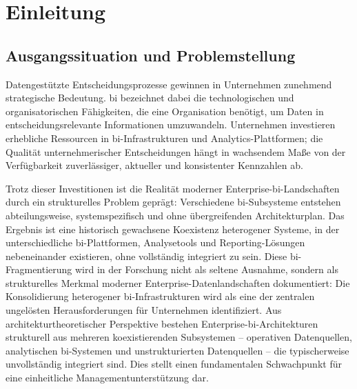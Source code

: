 \section{Einleitung}

\subsection{Ausgangssituation und Problemstellung}
\label{sec:einleitung-ausgangssituation}

Datengestützte Entscheidungsprozesse gewinnen in Unternehmen zunehmend strategische Bedeutung.
\gls{bi} bezeichnet dabei die technologischen und organisatorischen Fähigkeiten, die eine Organisation benötigt, um Daten in entscheidungsrelevante Informationen umzuwandeln.
Unternehmen investieren erhebliche Ressourcen in \gls{bi}-Infrastrukturen und Analytics-Plattformen; die Qualität unternehmerischer Entscheidungen hängt in wachsendem Maße von der Verfügbarkeit zuverlässiger, aktueller und konsistenter Kennzahlen ab.

Trotz dieser Investitionen ist die Realität moderner Enterprise-\gls{bi}-Landschaften durch ein strukturelles Problem geprägt: Verschiedene \gls{bi}-Subsysteme entstehen abteilungsweise, systemspezifisch und ohne übergreifenden Architekturplan.
Das Ergebnis ist eine historisch gewachsene Koexistenz heterogener Systeme, in der unterschiedliche \gls{bi}-Plattformen, Analysetools und Reporting-Lösungen nebeneinander existieren, ohne vollständig integriert zu sein.
Diese \gls{bi}-Fragmentierung wird in der Forschung nicht als seltene Ausnahme, sondern als strukturelles Merkmal moderner Enterprise-Datenlandschaften dokumentiert: Die Konsolidierung heterogener \gls{bi}-Infrastrukturen wird als eine der zentralen ungelösten Herausforderungen für Unternehmen identifiziert.
Aus architekturtheoretischer Perspektive bestehen Enterprise-\gls{bi}-Architekturen strukturell aus mehreren koexistierenden Subsystemen -- operativen Datenquellen, analytischen \gls{bi}-Systemen und unstrukturierten Datenquellen -- die typischerweise unvollständig integriert sind. Dies stellt einen fundamentalen Schwachpunkt für eine einheitliche Managementunterstützung dar.

